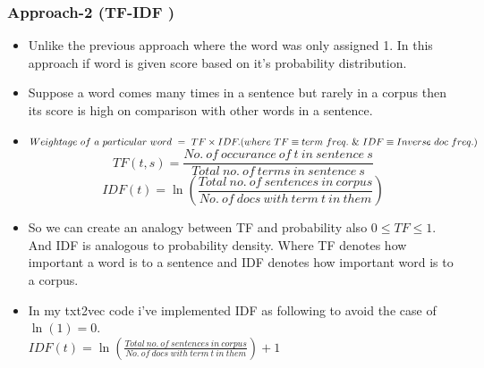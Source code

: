 \documentclass{article}
\begin{document}
\subsubsection*{Approach-2 (TF-IDF \cite{TF-IDF-blog})}
\begin{itemize}
\item Unlike the previous approach where the word was only assigned 1. In this approach if word is given score based on it's probability distribution.
\item Suppose a word comes many times in a sentence but rarely in a corpus then its score is high on comparison with other words in a sentence.
\item $Weightage\ of\ a\ particular\ word\ =\ TF \times IDF. \\ 
(where\ TF \equiv term\ freq.\ \&  \ IDF \equiv Inverse\ doc\ freq.)$
$$TF(t, s) = \frac{No.\ of\ occurance\ of\ t\ in\ sentence\ s}{Total\ no.\ of\ terms\ in\ sentence\ s}$$
$$
IDF(t) = \ln( \frac{Total\ no.\ of\ sentences\ in\ corpus}{No.\ of\ docs\ with\ term\ t\ in\ them})$$
\item So we can create an analogy between TF and probability also $0\leq TF\leq1.$ And IDF is analogous to probability density. Where TF denotes how important a word is to a sentence and IDF denotes how important word is to a corpus.
\item In my txt2vec code i've implemented IDF as following to avoid the case of $\ln(1) = 0$.\\$
IDF(t) = \ln( \frac{Total\ no.\ of\ sentences\ in\ corpus}{No.\ of\ docs\ with\ term\ t\ in\ them}) + 1$
\end{itemize}
\end{document}

